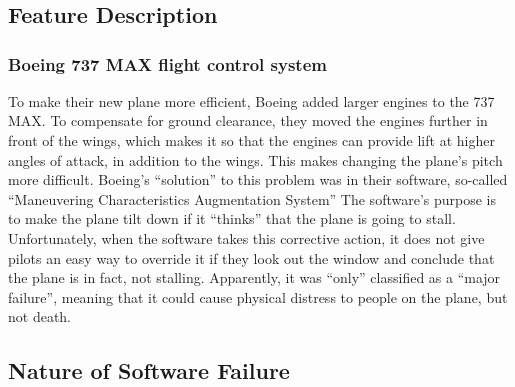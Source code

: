 \documentclass[letterpaper]{article}
\begin{document}
\section{}

\subsection*{Feature Description}
\subsubsection*{Boeing 737 MAX flight control system}
To make their new plane more efficient, Boeing added larger engines to the 737 MAX.
To compensate for ground clearance, they moved the engines further in front of the wings,
which makes it so that the engines can provide lift at higher angles of attack, in addition to the wings.
This makes changing the plane's pitch more difficult. Boeing's ``solution'' to this problem was in their software,
so-called “Maneuvering Characteristics Augmentation System”\cite{ieeespectrum}
The software's purpose is to make the plane tilt down if it ``thinks'' that the plane is going to stall.
Unfortunately, when the software takes this corrective action, it does not give pilots an easy way to override it if
they look out the window and conclude that the plane is in fact, not stalling.
Apparently, it was ``only'' classified as a ``major failure'', meaning that it could cause physical distress to people on the plane, but not death.\cite{gates_2019}

\subsection*{Nature of Software Failure}
\end{document}
